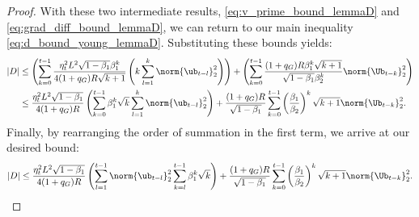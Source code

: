 \documentclass[11pt, letterpaper]{article}
\begin{document}
\begin{proof}
With these two intermediate results, \eqref{eq:v_prime_bound_lemmaD} and \eqref{eq:grad_diff_bound_lemmaD}, we can return to our main inequality \eqref{eq:d_bound_young_lemmaD}. Substituting these bounds yields:
\begin{align}
|D| &\leq
\left( \sum_{k=0}^{t-1} \frac{\eta_t^2 L^2 \sqrt{1 - \beta_1} \beta_1^k }{4 (1+q_G)R \sqrt{k + 1}} \left( k \sum_{l=1}^{k} \norm{\ub_{t-l}}^2_2 \right) \right)
+
\left(\sum_{k=0}^{t-1} \frac{(1+q_G)R \beta_1^k \sqrt{k+1}}{\sqrt{1-\beta_1} \beta_2^k}\norm{\Ub_{t-k}}_2^2\right) \nonumber \\
&\leq
\frac{\eta_t^2 L^2\sqrt{1 - \beta_1}}{4 (1+q_G)R}\left( \sum_{k=0}^{t-1}\beta_1^k \sqrt{k} \sum_{l=1}^{k} \norm{\ub_{t-l}}^2_2 \right)
+
\frac{(1+q_G)R}{\sqrt{1 - \beta_1}} \sum_{k=0}^{t-1} \left(\frac{\beta_1}{\beta_2}\right)^k \sqrt{k+1}\norm{\Ub_{t-k}}_2^2. \nonumber
\end{align}
Finally, by rearranging the order of summation in the first term, we arrive at our desired bound:
\begin{align}
|D| \leq \frac{\eta_t^2 L^2 \sqrt{1 - \beta_1}}{4 (1+q_G)R}\left( \sum_{l=1}^{t-1}\norm{\ub_{t-l}}_2^2\sum_{k=l}^{t - 1}\beta_1^k \sqrt{k} \right)
+\frac{(1+q_G)R}{\sqrt{1 - \beta_1}} \sum_{k=0}^{t-1} \left(\frac{\beta_1}{\beta_2}\right)^k \sqrt{k+1}\norm{\Ub_{t-k}}_2^2.
\end{align}
\end{proof}
\end{document}
